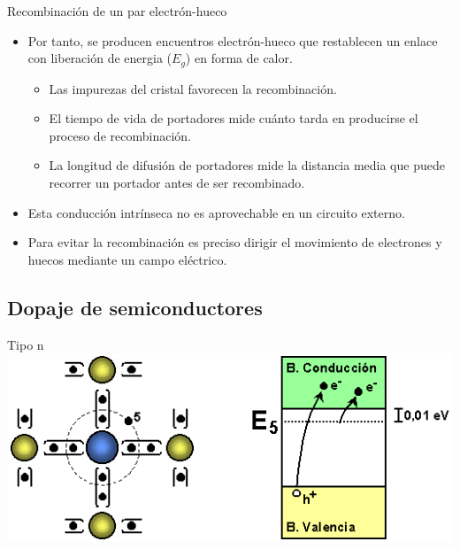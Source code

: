 \documentclass[xcolor={usenames,svgnames,dvipsnames}]{beamer}
\begin{document}
\begin{frame}[label=sec-1-2-2]{Recombinación de un par electrón-hueco}
\begin{itemize}
\item Por tanto, se producen \alert{encuentros electrón-hueco} que restablecen un enlace con liberación de energia ($E_{g}$) en forma de calor.

\begin{itemize}
\item Las impurezas del cristal favorecen la recombinación.

\item El tiempo de vida de portadores mide cuánto tarda en producirse el proceso de recombinación.

\item La longitud de difusión de portadores mide la distancia media que puede recorrer un portador antes de ser recombinado.
\end{itemize}

\item Esta \alert{conducción intrínseca} \alert{no es aprovechable} en un circuito externo.

\item Para evitar la recombinación \alert{es preciso dirigir el movimiento} de electrones y huecos mediante un campo eléctrico.
\end{itemize}
\end{frame}

\subsection{Dopaje de semiconductores}
\label{sec-1-3}
\begin{frame}[label=sec-1-3-1]{Tipo n}
\includegraphics[width=.9\linewidth]{../figs/Semiconductor_tipo_n.png}
\end{frame}
\end{document}
